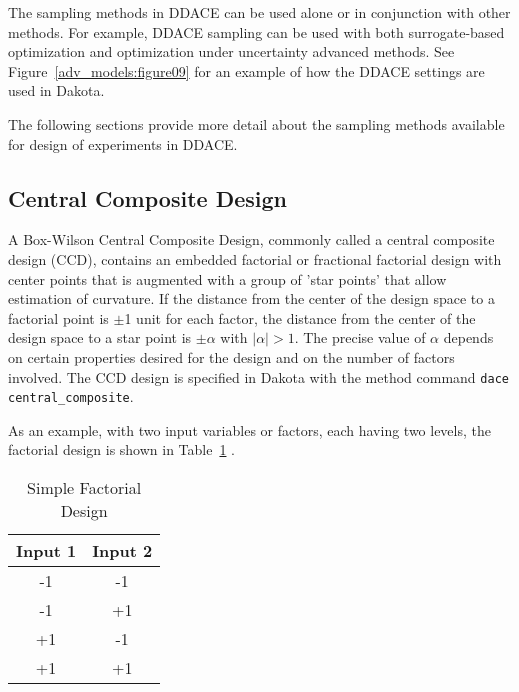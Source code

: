 The sampling methods in DDACE can be used alone or in conjunction with
other methods. For example, DDACE sampling can be used with both
surrogate-based optimization and optimization under uncertainty
advanced methods. See Figure~\ref{adv_models:figure09} for an example
of how the DDACE settings are used in Dakota.


The following sections provide more detail about the sampling 
methods available for design of experiments in DDACE. 

\subsection{Central Composite Design}\label{dace:ccd}

A Box-Wilson Central Composite Design, commonly called a central
composite design (CCD), contains an embedded factorial or fractional
factorial design with center points that is augmented with a group of
'star points' that allow estimation of curvature. If the distance
from the center of the design space to a factorial point is $\pm$1
unit for each factor, the distance from the center of the design space
to a star point is $\pm\alpha$ with $\mid\alpha\mid > 1$. The precise
value of $\alpha$ depends on certain properties desired for the design and on
the number of factors involved. The CCD design is specified in Dakota
with the method command \texttt{dace central\_composite}.

As an example, with two input variables or factors, each having two 
levels, the factorial design is shown in Table~\ref{dace:table01} . 

\begin{table}[ht]
 \caption{Simple Factorial Design}
 \label{dace:table01}	
 \begin{center}
  \begin{tabular}{c|c}
  \hline
  Input 1            & Input 2         \\ \hline \hline 
  -1                 & -1             \\ \hline 
  -1                 & +1           \\ \hline
  +1                 & -1      \\ \hline
  +1                 & +1        \\ \hline
  \end{tabular}
\end{center}
\end{table}


